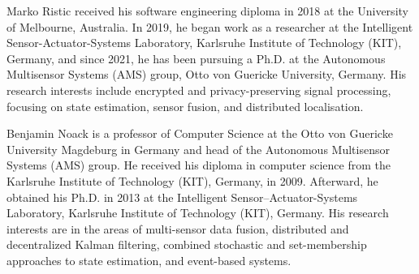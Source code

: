 \documentclass[10pt,letterpaper,oneside,twocolumn,journal]{IEEEtran}
\theoremstyle{definition}
\theoremstyle{definition}
\theoremstyle{remark}
\begin{document}
\ifCLASSOPTIONcaptionsoff
  \newpage
\fi





% 
%                                         
%                                         
%                                         
% 

\begin{IEEEbiography}{Marko Ristic}
received his software engineering diploma in 2018 at the University of Melbourne, Australia. In 2019, he began work as a researcher at the Intelligent Sensor-Actuator-Systems Laboratory, Karlsruhe Institute of Technology (KIT), Germany, and since 2021, he has been pursuing a Ph.D. at the Autonomous Multisensor Systems (AMS) group, Otto von Guericke University, Germany. His research interests include encrypted and privacy-preserving signal processing, focusing on state estimation, sensor fusion, and distributed localisation.
\end{IEEEbiography}

\begin{IEEEbiography}{Benjamin Noack}
is a professor of Computer Science at the Otto von Guericke University Magdeburg in Germany and head of the Autonomous Multisensor Systems (AMS) group. He received his diploma in computer science from the Karlsruhe Institute of Technology (KIT), Germany, in 2009. Afterward, he obtained his Ph.D. in 2013 at the Intelligent Sensor–Actuator-Systems Laboratory, Karlsruhe Institute of Technology (KIT), Germany. His research interests are in the areas of multi-sensor data fusion, distributed and decentralized Kalman filtering, combined stochastic and set-membership approaches to state estimation, and event-based systems.
\end{IEEEbiography}
\end{document}
